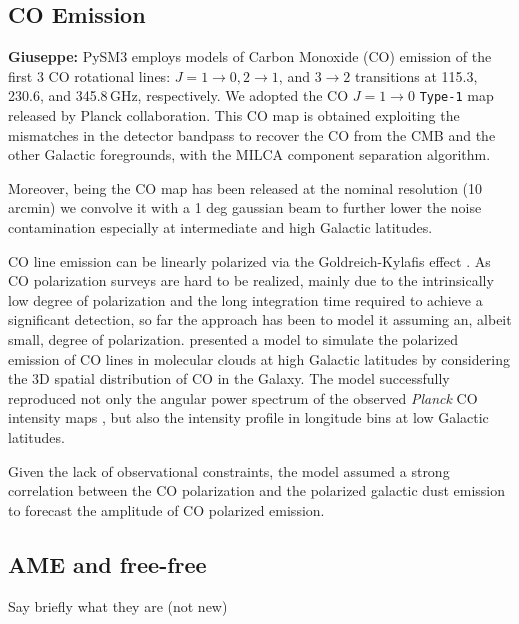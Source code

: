 
\subsection{CO Emission}
\textbf{Giuseppe:} 
PySM3 employs models of Carbon Monoxide (CO) emission  of  the first 3 CO rotational lines: $J = 1\rightarrow0, 2\rightarrow1$, and $3\rightarrow2$ transitions at 115.3, 230.6, and 345.8\,GHz, respectively. We adopted  the CO $J = 1\rightarrow0$ \texttt{Type-1} map released by Planck collaboration.  This CO map is obtained exploiting the mismatches in the detector bandpass to recover the CO from the CMB and the other Galactic foregrounds, with the MILCA component separation algorithm.  
 
 Moreover, being the  CO map has been released at the nominal resolution (10  arcmin) we convolve it with a 1 deg gaussian beam to further lower the noise contamination  especially at intermediate and high Galactic latitudes. 


CO line emission can be linearly polarized via the Goldreich-Kylafis effect \citep{Goldreich:1981, Crutcher:2012}.  As CO polarization surveys are hard to be realized,  mainly due to the intrinsically low degree of polarization and the long integration time required to achieve a significant detection,  so far the approach has been to model it assuming an, albeit small, degree of polarization. \citet{Puglisi:2017} presented a model to simulate the polarized emission of CO lines in molecular clouds at high Galactic latitudes by considering the 3D spatial distribution of CO in the Galaxy. The model   successfully reproduced not only the angular power spectrum of the observed \emph{Planck}  CO intensity maps \citep{planck2013-p03a},  but also the intensity profile  in longitude bins at low Galactic latitudes.  

Given the lack of observational constraints, the model assumed a strong correlation between the CO polarization and the polarized galactic dust emission to forecast the amplitude of CO polarized emission.

\subsection{AME and free-free}

Say briefly what they are (not new)